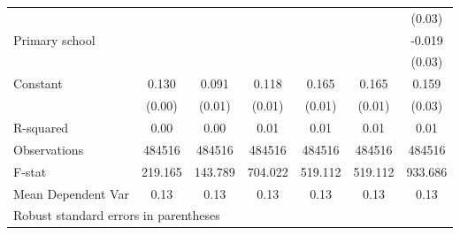 {\begin{tabular}{l*{6}{c}}
                    &                     &                     &                     &                     &                     &      (0.03)         \\
Primary school      &                     &                     &                     &                     &                     &      -0.019         \\
                    &                     &                     &                     &                     &                     &      (0.03)         \\
Constant            &       0.130\sym{***}&       0.091\sym{***}&       0.118\sym{***}&       0.165\sym{***}&       0.165\sym{***}&       0.159\sym{***}\\
                    &      (0.00)         &      (0.01)         &      (0.01)         &      (0.01)         &      (0.01)         &      (0.03)         \\
\hline
R-squared           &        0.00         &        0.00         &        0.01         &        0.01         &        0.01         &        0.01         \\
Observations        &      484516         &      484516         &      484516         &      484516         &      484516         &      484516         \\
F-stat              &     219.165         &     143.789         &     704.022         &     519.112         &     519.112         &     933.686         \\
Mean Dependent Var  &        0.13         &        0.13         &        0.13         &        0.13         &        0.13         &        0.13         \\
\hline\hline
\multicolumn{7}{l}{\footnotesize Robust standard errors in parentheses}\\
\end{tabular}
}
